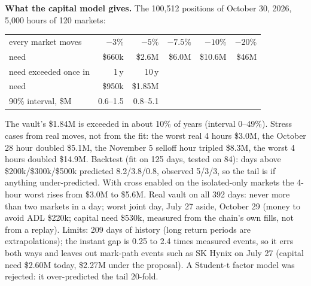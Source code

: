 \documentclass[10.5pt,a4paper]{article}
\newcommand{\resh}[2]{\par\textbf{#1} #2\par}
\begin{document}
\resh{What the capital model gives.}{The 100{,}512 positions of October 30, 2026, 5{,}000 hours of 120 markets:\par
\begin{tabular}{@{}lrrrrr@{}}
\toprule
every market moves & $-3\%$ & $-5\%$ & $-7.5\%$ & $-10\%$ & $-20\%$\\
need & \$660k & \$2.6M & \$6.0M & \$10.6M & \$46M\\
\midrule
need exceeded once in & 1\,y & 10\,y & & &\\
need & \$950k & \$1.85M & & &\\
90\% interval, \$M & 0.6--1.5 & 0.8--5.1 & & &\\
\bottomrule
\end{tabular}\par
The vault's \$1.84M is exceeded in about 10\% of years (interval 0--49\%). Stress cases from real moves, not from the fit: the worst real 4 hours \$3.0M, the October 28 hour doubled \$5.1M, the November 5 selloff hour tripled \$8.3M, the worst 4 hours doubled \$14.9M. Backtest (fit on 125 days, tested on 84): days above \$200k/\$300k/\$500k predicted 8.2/3.8/0.8, observed 5/3/3, so the tail is if anything under-predicted. With cross enabled on the isolated-only markets the 4-hour worst rises from \$3.0M to \$5.6M. Real vault on all 392 days: never more than two markets in a day; worst joint day, July 27 aside, October 29 (money to avoid ADL \$220k; capital need \$530k, measured from the chain's own fills, not from a replay). Limits: 209 days of history (long return periods are extrapolations); the instant gap is 0.25 to 2.4 times measured events, so it errs both ways and leaves out mark-path events such as SK Hynix on July 27 (capital need \$2.60M today, \$2.27M under the proposal). A Student-t factor model was rejected: it over-predicted the tail 20-fold.}

\end{document}
